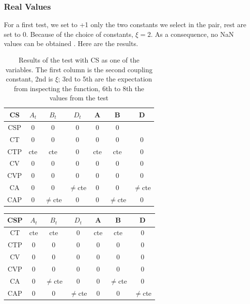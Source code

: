 \documentclass[twocolumn]{article}
\begin{document}
\subsubsection{Real Values}

For a first test, we set to +1 only the two constants we select in the pair, rest are set to 0. Because of the choice of constants, $\xi=2$. As a consequence, no NaN values can be obtained . Here are the results.

\begin{table}[H]
	\begin{tabular}{|c|c|c|c|c|c|c|}
		\hline
		CS & $A_t$ & $B_t$ & $D_t$ & A & B & D \\
		\hline
		CSP & 0 & 0 & 0 & 0 & 0 & \\
		\hline
		CT & 0 & 0 & 0 & 0 & 0 & 0\\
		\hline
		CTP & cte & cte & 0 & cte& cte & 0\\
		\hline
		CV & 0 & 0 & 0 & 0 & 0 & 0 \\
		\hline
		CVP & 0 & 0 & 0 & 0 & 0 & 0\\
		\hline
		CA & 0 & 0 & $\neq$cte & 0 & 0 & $\neq$cte\\
		\hline
		CAP & 0 & $\neq$cte & 0 & 0 & $\neq$cte & 0\\
		\hline
	\end{tabular}
	\caption{Results of the test with CS as one of the variables. The first column is the second coupling constant, 2nd is $\xi$; 3rd to 5th are the expectation from inspecting the function, 6th to 8th the values from the test}
\end{table}

\begin{table}[H]
	\begin{tabular}{|c|c|c|c|c|c|c|}
		\hline
		CSP & $A_t$ & $B_t$ & $D_t$ & A & B & D \\
		\hline
		CT & cte & cte & 0 & cte & cte  &0 \\
		\hline
		CTP & 0 & 0 & 0 & 0 & 0 & 0\\
		\hline
		CV & 0 & 0 & 0 & 0 & 0 & 0\\
		\hline
		CVP & 0 & 0 & 0 & 0 & 0 & 0\\
		\hline
		CA & 0 & $\neq$cte & 0 & 0 & $\neq$cte & 0\\
		\hline
		CAP & 0 & 0 & $\neq$cte & 0 & 0 & $\neq$cte \\
		\hline
	\end{tabular}
\end{table}
\end{document}
